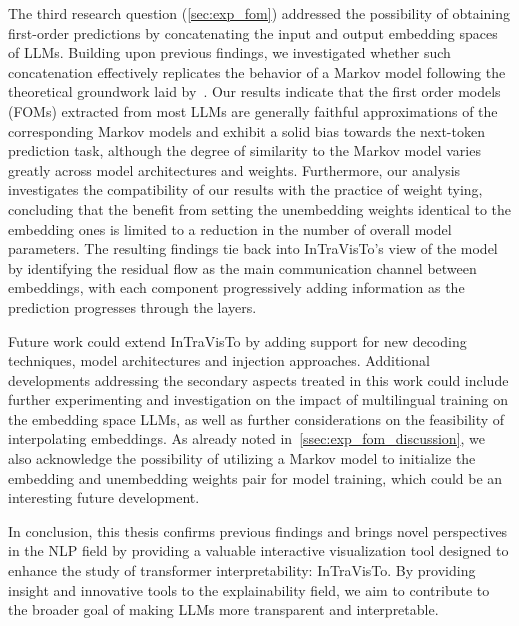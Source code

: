 The third research question (\cref{sec:exp_fom}) addressed the possibility of obtaining first-order predictions by concatenating the input and output embedding spaces of LLMs.
Building upon previous findings, we investigated whether such concatenation effectively replicates the behavior of a Markov model following the theoretical groundwork laid by~\citet{elhage2021}.
Our results indicate that the first order models (FOMs) extracted from most LLMs are generally faithful approximations of the corresponding Markov models and exhibit a solid bias towards the next-token prediction task, although the degree of similarity to the Markov model varies greatly across model architectures and weights.
Furthermore, our analysis investigates the compatibility of our results with the practice of weight tying, concluding that the benefit from setting the unembedding weights identical to the embedding ones is limited to a reduction in the number of overall model parameters.
The resulting findings tie back into InTraVisTo's view of the model by identifying the residual flow as the main communication channel between embeddings, with each component progressively adding information as the prediction progresses through the layers.

Future work could extend InTraVisTo by adding support for new decoding techniques, model architectures and injection approaches.
Additional developments addressing the secondary aspects treated in this work could include further experimenting and investigation on the impact of multilingual training on the embedding space LLMs, as well as further considerations on the feasibility of interpolating embeddings.
As already noted in~\cref{ssec:exp_fom_discussion}, we also acknowledge the possibility of utilizing a Markov model to initialize the embedding and unembedding weights pair for model training, which could be an interesting future development.

In conclusion, this thesis confirms previous findings and brings novel perspectives in the NLP field by providing a valuable interactive visualization tool designed to enhance the study of transformer interpretability: InTraVisTo.
By providing insight and innovative tools to the explainability field, we aim to contribute to the broader goal of making LLMs more transparent and interpretable.
